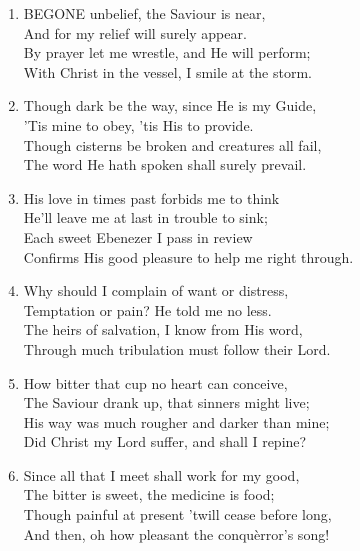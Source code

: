 \documentclass[11pt,a4paper]{article}
\begin{document}
\begin{enumerate}
    \item BEGONE unbelief, the Saviour is near, \\
        And for my relief will surely appear. \\
        By prayer let me wrestle, and He will perform; \\
        With Christ in the vessel, I smile at the storm.

    \item Though dark be the way, since He is my Guide, \\
        'Tis mine to obey, 'tis His to provide. \\
        Though cisterns be broken and creatures all fail, \\
        The word He hath spoken shall surely prevail.

    \item His love in times past forbids me to think \\
        He'll leave me at last in trouble to sink; \\
        Each sweet Ebenezer I pass in review \\
        Confirms His good pleasure to help me right through.

    \item Why should I complain of want or distress, \\
        Temptation or pain? He told me no less. \\
        The heirs of salvation, I know from His word, \\
        Through much tribulation must follow their Lord.

    \item How bitter that cup no heart can conceive, \\
        The Saviour drank up, that sinners might live; \\
        His way was much rougher and darker than mine; \\
        Did Christ my Lord suffer, and shall I repine?

    \item Since all that I meet shall work for my good, \\
        The bitter is sweet, the medicine is food; \\
        Though painful at present 'twill cease before long, \\
        And then, oh how pleasant the conqu\`error's song!

\end{enumerate}
\end{document}
